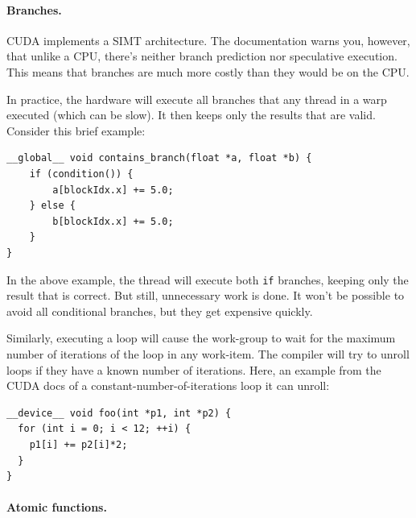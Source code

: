 \paragraph{Branches.} CUDA implements a SIMT architecture. The documentation warns you, however, that unlike a CPU, there's neither branch prediction nor speculative execution. This means that branches are much more costly than they would be on the CPU. 

In practice, the hardware will execute all branches that any thread in
a warp executed (which can be slow). It then keeps only the results that are valid. Consider this brief example:

{\scriptsize \hspace*{2em} \begin{minipage}{.5\textwidth}
    \begin{lstlisting}
__global__ void contains_branch(float *a, float *b) {
    if (condition()) {
        a[blockIdx.x] += 5.0;
    } else {
        b[blockIdx.x] += 5.0;
    }
}
    \end{lstlisting}
\end{minipage} }


In the above example, the thread will execute both {\tt if} branches, keeping only the
result that is correct. But still, unnecessary work is done. It won't be possible to avoid all conditional branches, but they get expensive quickly.

Similarly, executing a loop will cause the
work-group to wait for the maximum number of iterations of the loop in
any work-item. The compiler will try to unroll loops if they have a known number of iterations. Here, an example from the CUDA docs of a constant-number-of-iterations loop it can unroll:

{\scriptsize \vspace*{-1em} \hspace*{2em} \begin{minipage}{.5\textwidth}
    \begin{lstlisting}
__device__ void foo(int *p1, int *p2) {
  for (int i = 0; i < 12; ++i) {
    p1[i] += p2[i]*2;
  }
}
    \end{lstlisting}
\end{minipage} }

\vspace*{-1em}
\paragraph{Atomic functions.}

